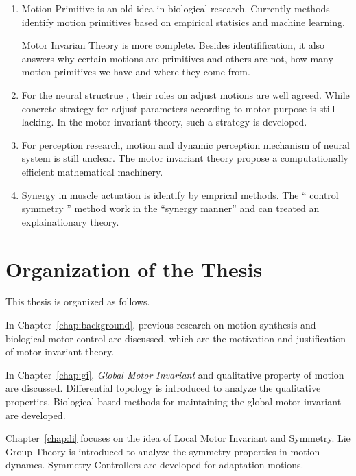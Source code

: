 \begin{enumerate}
\item Motion Primitive is an old idea in biological research. 
Currently methods identify motion primitives based on empirical statisics and machine learning.

Motor Invarian Theory is more complete.
Besides identifification, it also answers why certain motions are primitives and others are not,
how many motion primitives we have and where they come from.

\item For the neural structrue \cpg , their roles on adjust motions are well agreed.
While concrete strategy for adjust \cpg parameters according to motor purpose is still lacking.
In the motor invariant theory,  such a strategy is developed.

\item For perception research, motion and dynamic perception mechanism of neural system is still unclear.
The motor invariant theory propose a computationally efficient mathematical machinery.

\item Synergy in muscle actuation is identify by emprical methods. 
The `` control symmetry '' method work in the ``synergy manner''  and can treated an explainationary theory.
\end{enumerate}







\section{Organization of the Thesis}

This thesis is organized as follows.
 
In Chapter~\ref{chap:background}, previous research on motion synthesis and biological motor control are discussed, which are the motivation and justification of motor invariant theory.
 
In Chapter~\ref{chap:gi}, \emph{Global Motor Invariant} and qualitative property of motion are discussed. 
Differential topology is introduced to analyze the qualitative properties.
Biological based  methods for maintaining the global motor invariant are developed.

Chapter~\ref{chap:li} focuses on the idea of Local Motor Invariant and Symmetry.
Lie Group Theory is  introduced  to analyze the symmetry properties in motion dynamcs.
Symmetry Controllers are developed for adaptation motions.
 



